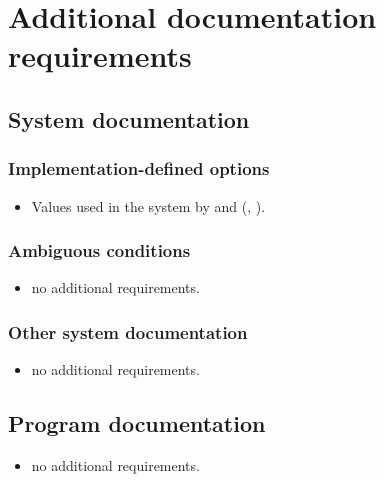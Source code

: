 \section{Additional documentation requirements} %

\subsection{System documentation} %

\subsubsection{Implementation-defined options} %
\begin{itemize}
\item Values used in the system by  and
	(,
	 ).
\end{itemize}

\subsubsection{Ambiguous conditions} %
\begin{itemize}
\item no additional requirements.
\end{itemize}

\enlargethispage{6ex}
\subsubsection{Other system documentation} %
\begin{itemize}
\item no additional requirements.
\end{itemize}

\subsection{Program documentation} %
\begin{itemize}
\item no additional requirements.
\end{itemize}




